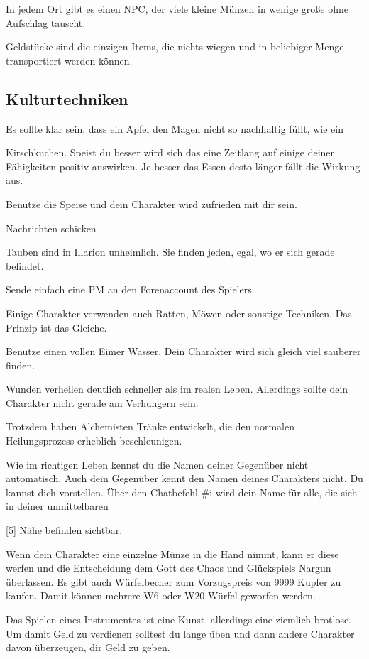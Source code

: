 \documentclass[a4paper,11pt]{book}
\begin{document}
In jedem Ort gibt es einen NPC, der viele kleine Münzen in wenige große ohne Aufschlag tauscht.

Geldstücke sind die einzigen Items, die nichts wiegen und in beliebiger Menge transportiert werden können.

\subsection{Kulturtechniken}

Es sollte klar sein, dass ein Apfel den Magen nicht so nachhaltig füllt, wie ein

Kirschkuchen. Speist du besser wird sich das eine Zeitlang auf einige deiner Fähigkeiten positiv auswirken. Je besser das Essen desto länger fällt die Wirkung aus.

Benutze die Speise und dein Charakter wird zufrieden mit dir sein.

Nachrichten schicken

Tauben sind in Illarion unheimlich. Sie finden jeden, egal, wo er sich gerade befindet.

Sende einfach eine PM an den Forenaccount des Spielers.

Einige Charakter verwenden auch Ratten, Möwen oder sonstige Techniken. Das Prinzip ist das Gleiche.

Benutze einen vollen Eimer Wasser. Dein Charakter wird sich gleich viel sauberer finden.

Wunden verheilen deutlich schneller als im realen Leben. Allerdings sollte dein Charakter nicht gerade am Verhungern sein.

Trotzdem haben Alchemisten Tränke entwickelt, die den normalen Heilungsprozess erheblich beschleunigen.

Wie im richtigen Leben kennst du die Namen deiner Gegenüber nicht automatisch. Auch dein Gegenüber kennt den Namen deines Charakters nicht. Du kannst dich vorstellen. Über den Chatbefehl \#i wird dein Name für alle, die sich in deiner unmittelbaren

[5] Nähe befinden sichtbar.

Wenn dein Charakter eine einzelne Münze in die Hand nimmt, kann er diese werfen und die Entscheidung dem Gott des Chaos und Glückspiels Nargun überlassen. Es gibt auch Würfelbecher zum Vorzugspreis von 9999 Kupfer zu kaufen. Damit können mehrere W6 oder W20 Würfel geworfen werden.

Das Spielen eines Instrumentes ist eine Kunst, allerdings eine ziemlich brotlose. Um damit Geld zu verdienen solltest du lange üben und dann andere Charakter davon überzeugen, dir Geld zu geben.
\end{document}
